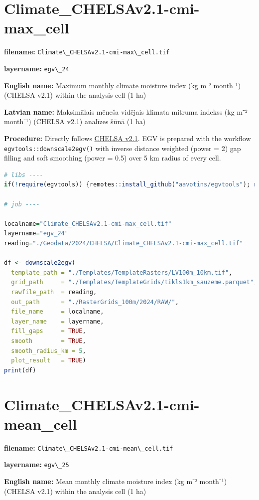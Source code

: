 \documentclass[
]{book}
\newcommand{\passthrough}[1]{#1}
\begin{document}
\section{Climate\_CHELSAv2.1-cmi-max\_cell}\label{ch06.024}

\textbf{filename:} \passthrough{\lstinline!Climate\_CHELSAv2.1-cmi-max\_cell.tif!}

\textbf{layername:} \passthrough{\lstinline!egv\_24!}

\textbf{English name:} Maximum monthly climate moisture index (kg m⁻² month⁻¹) (CHELSA v2.1) within the analysis cell (1 ha)

\textbf{Latvian name:} Maksimālais mēneša vidējais klimata mitruma indekss (kg m⁻² month⁻¹) (CHELSA v2.1) analīzes šūnā (1 ha)

\textbf{Procedure:} Directly follows \hyperref[Ch04.11]{CHELSA v2.1}. EGV is prepared with the
workflow \passthrough{\lstinline!egvtools::downscale2egv()!} with inverse distance weighted (power = 2)
gap filling and soft smoothing (power = 0.5) over 5 km radius of every cell.

\begin{lstlisting}[language=R]
# libs ----
if(!require(egvtools)) {remotes::install_github("aavotins/egvtools"); require(egvtools)}

# job ----

localname="Climate_CHELSAv2.1-cmi-max_cell.tif"
layername="egv_24"
reading="./Geodata/2024/CHELSA/Climate_CHELSAv2.1-cmi-max_cell.tif"

df <- downscale2egv(
  template_path = "./Templates/TemplateRasters/LV100m_10km.tif",
  grid_path     = "./Templates/TemplateGrids/tikls1km_sauzeme.parquet",
  rawfile_path  = reading,
  out_path      = "./RasterGrids_100m/2024/RAW/",
  file_name     = localname,
  layer_name    = layername,
  fill_gaps     = TRUE,
  smooth        = TRUE,
  smooth_radius_km = 5,
  plot_result   = TRUE)
print(df)
\end{lstlisting}

\section{Climate\_CHELSAv2.1-cmi-mean\_cell}\label{ch06.025}

\textbf{filename:} \passthrough{\lstinline!Climate\_CHELSAv2.1-cmi-mean\_cell.tif!}

\textbf{layername:} \passthrough{\lstinline!egv\_25!}

\textbf{English name:} Mean monthly climate moisture index (kg m⁻² month⁻¹) (CHELSA v2.1) within the analysis cell (1 ha)
\end{document}
